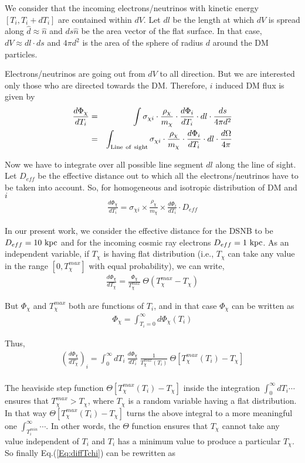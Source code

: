 \documentclass[11pt,prd,twocolumn,nofootinbib,reprint,superscriptaddress,longbibliography,colorlinks=true,citecolor=blue]{revtex4-1}
\def\bea{\begin{eqnarray}}
\def\eea{\end{eqnarray}}
\begin{document}
 We consider that the incoming electrons/neutrinos with kinetic energy $\left[ T_i, T_i + dT_i \right]$  are contained within $dV$. Let $dl$  be the length at which $dV$ is spread along $\hat{d}\approx\hat{n}$ and $ds \hat{n}$ be the area vector of the flat surface. In that case, $ dV \approx dl \cdot ds$ and $4 \pi d^2$ is the area of the sphere of radius $d$ around the DM particles.
 
 Electrons/neutrinos are going out from $dV$ to all direction. But we are interested only those who are directed towards the DM. Therefore, $i$ induced DM flux is given by
 \bea
 \frac{d\Phi_\chi}{dT_i} &=& \int \sigma_{\chi i} \cdot  \frac{\rho_\chi}{m_\chi} \cdot \frac{d\Phi_i}{dT_i} \cdot dl \cdot \frac{ds}{4 \pi d^2} \nonumber \\
 &=& \int_{\rm{Line~of~sight}} \sigma_{\chi i} \cdot  \frac{\rho_\chi}{m_\chi} \cdot \frac{d\Phi_i}{dT_i} \cdot dl \cdot \frac{d\Omega}{4 \pi}
 \eea
 
 Now we have to integrate over all possible line segment $dl$ along the line of sight. Let $D_{eff}$ be the effective distance out to which all the electrons/neutrinos have to be taken into account. So, for homogeneous and isotropic distribution of DM and $i$ 
 \bea
 \frac{d\Phi_{\chi}}{dT_i} = \sigma_{\chi i} \times \frac{\rho_\chi}{m_\chi} \times \frac{d\Phi_i}{dT_i} \cdot D_{eff}
 \eea
 
 In our present work, we consider the effective distance for the DSNB to be $D_{eff}=10~\rm{kpc}$ and for the incoming cosmic ray electrons $D_{eff}=1~\rm{kpc}$.
 As an independent variable, if $T_\chi$ is having flat distribution (i.e., $T_\chi$ can take any value in the range $\left[ 0,T_\chi^{max} \right]$ with equal probability), we can write, 
 \bea
 \frac{d\Phi_\chi}{dT_\chi} =  \frac{\Phi_\chi}{T_\chi^{max}}~ \Theta(T_\chi^{max} - T_\chi)
 \eea
 
 But $\Phi_\chi$ and $T_\chi^{max}$ both are functions of $T_i$, and  in that case $\Phi_\chi$ can be written as \bea\Phi_\chi = \int_{T_i = 0}^\infty d\Phi_\chi(T_i) \nonumber \eea
 
 Thus, 
 \bea
 \left(\frac{d\Phi_\chi}{dT_\chi}\right)_i = \int_{ 0}^\infty dT_i ~\frac{d\Phi_\chi}{dT_i}~ \frac{1}{T_\chi^{max}(T_i)}~ \Theta\left[T_\chi^{max}(T_i) - T_\chi \right] \nonumber \\
 \label{Eq:diffTchi}
 \eea
 
   The heaviside step function $\Theta\left[T_\chi^{max}(T_i) - T_\chi \right]$ inside the integration $\int_0^{\infty} dT_i \cdots $ ensures that $T_\chi^{max} > T_\chi$, where $T_\chi$ is a random variable having a flat distribution. In that way $\Theta\left[T_\chi^{max}(T_i) - T_\chi \right]$ turns the above integral to a more meaningful one  $\int_{T_i^{min}}^{\infty} \cdots$. In other words, the $\Theta$ function ensures that $T_\chi$ cannot take any value independent of $T_i$ and $T_i$ has a minimum value to produce a particular $T_\chi$.
So finally Eq.(\ref{Eq:diffTchi}) can be rewritten as 
 
\end{document}
